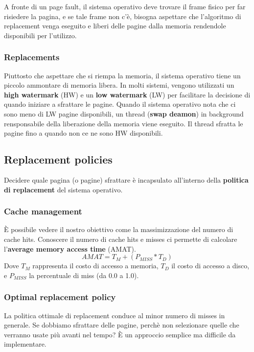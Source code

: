 \documentclass[12pt, twoside, letterpaper]{article}
\begin{document}
				A fronte di un page fault, il sistema operativo deve trovare il frame fisico per far risiedere la pagina, e se tale frame non c'è, bisogna aspettare che l'algoritmo di replacement venga eseguito e liberi delle pagine dalla memoria rendendole disponibili per l'utilizzo.
			
			\subsubsection{Replacements}
				Piuttosto che aspettare che si riempa la memoria, il sistema operativo tiene un piccolo ammontare di memoria libera. In molti sistemi, vengono utilizzati un \textbf{high watermark} (HW) e un \textbf{low watermark} (LW) per facilitare la decisione di quando iniziare a sfrattare le pagine. Quando il sistema operativo nota che ci sono meno di LW pagine disponibili, un thread (\textbf{swap deamon}) in background rensponsabile della liberazione della memoria viene eseguito. Il thread sfratta le pagine fino a quando non ce ne sono HW disponibili. 
			
				
		\subsection{Replacement policies}
			Decidere quale pagina (o pagine) sfrattare è incapsulato all'interno della \textbf{politica di replacement} del sistema operativo.
			
			\subsubsection{Cache management}
				È possibile vedere il nostro obiettivo come la massimizzazione del numero di cache hits. Conoscere il numero di cache hits e misses ci permette di calcolare l'\textbf{average memory access time} (AMAT).
				$$AMAT = T_M + (P_{MISS}*T_D)$$
				Dove $T_M$ rappresenta il costo di accesso a memoria, $T_D$ il costo di accesso a disco, e $P_{MISS}$ la percentuale di miss (da 0.0 a 1.0). 
				
			\subsubsection{Optimal replacement policy}
				La politica ottimale di replacement conduce al minor numero di misses in generale. Se dobbiamo sfrattare delle pagine, perchè non selezionare quelle che verranno usate più avanti nel tempo? È un approccio semplice ma difficile da implementare.
				
\end{document}
